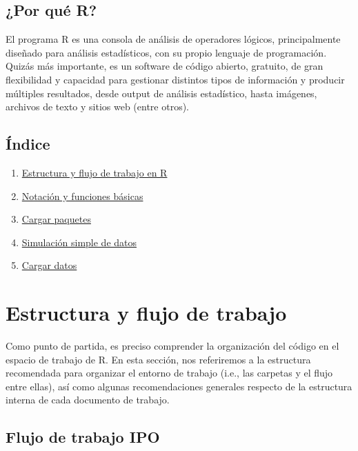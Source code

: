 \documentclass[
]{book}
\providecommand{\tightlist}{%
  \setlength{\itemsep}{0pt}\setlength{\parskip}{0pt}}
\begin{document}
\section*{¿Por qué R?}\label{por-quuxe9-r}

El programa R es una consola de análisis de operadores lógicos, principalmente diseñado para análisis estadísticos, con su propio lenguaje de programación. Quizás más importante, es un software de código abierto, gratuito, de gran flexibilidad y capacidad para gestionar distintos tipos de información y producir múltiples resultados, desde output de análisis estadístico, hasta imágenes, archivos de texto y sitios web (entre otros).

\section*{Índice}\label{uxedndice}

\begin{enumerate}
\def\labelenumi{\arabic{enumi}.}
\tightlist
\item
  \hyperref[estructura-flujo]{Estructura y flujo de trabajo en R}\\
\item
  \hyperref[notacion-funciones]{Notación y funciones básicas}\\
\item
  \hyperref[paquetes]{Cargar paquetes}\\
\item
  \hyperref[simulaciuxf3n]{Simulación simple de datos}\\
\item
  \hyperref[carga-datos]{Cargar datos}
\end{enumerate}

\chapter{Estructura y flujo de trabajo}\label{estructura-flujo}

Como punto de partida, es preciso comprender la organización del código en el espacio de trabajo de R. En esta sección, nos referiremos a la estructura recomendada para organizar el entorno de trabajo (i.e., las carpetas y el flujo entre ellas), así como algunas recomendaciones generales respecto de la estructura interna de cada documento de trabajo.

\section{Flujo de trabajo IPO}\label{flujo-de-trabajo-ipo}
\end{document}

